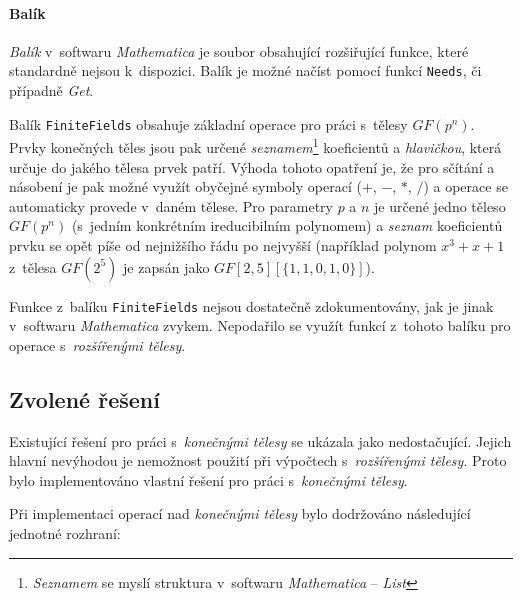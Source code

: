 \documentclass[thesis=M,czech,hidelinks]{FITthesis}[2012/06/26]
\newcommand{\0}{{\textcolor[gray]{0.80}{0}}}
\begin{document}
\paragraph{Balík} \emph{Balík} v~softwaru \emph{Mathematica} je soubor
obsahující rozšiřující funkce, které standardně nejsou k~dispozici. Balík je
možné načíst pomocí funkcí \texttt{Needs}, či případně \emph{Get}.

Balík \texttt{FiniteFields} obsahuje základní operace pro práci s~tělesy
$GF(p^n)$. Prvky konečných těles jsou pak určené \emph{seznamem}\footnote{
    \emph{Seznamem} se myslí struktura v~softwaru
    \emph{Mathematica} -- \emph{List}
} koeficientů a \emph{hlavičkou}, která určuje do jakého tělesa prvek patří.
Výhoda tohoto opatření je, že pro sčítání a násobení je pak možné využít
obyčejné symboly operací ($+$, $-$, $*$, $/$) a operace se automaticky provede
v~daném tělese.  Pro parametry $p$ a $n$ je určené jedno těleso $GF(p^n)$
(s~jedním konkrétním ireducibilním polynomem) a \emph{seznam} koeficientů prvku
se opět píše od nejnižšího řádu po nejvyšší (například polynom $x^3 + x + 1$
z~tělesa $GF(2^5)$ je zapsán jako $GF[2,5][\{1,1,0,1,0\}] $).

Funkce z~balíku \texttt{FiniteFields} nejsou dostatečně zdokumentovány, jak
je jinak v~softwaru \emph{Mathematica} zvykem. Nepodařilo se využít funkcí
z~tohoto balíku pro operace s~\emph{rozšířenými tělesy}.

\subsection{Zvolené řešení}
Existující řešení pro práci s~\emph{konečnými tělesy} se ukázala jako
nedostačující. Jejich hlavní nevýhodou je nemožnost použití při výpočtech
s~\emph{rozšířenými tělesy}. Proto bylo implementováno vlastní řešení pro práci
s~\emph{konečnými tělesy}.

Při implementaci operací nad \emph{konečnými tělesy} bylo dodržováno následující
jednotné rozhraní:
\end{document}
